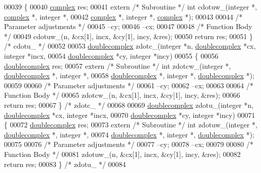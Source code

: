 \begin{DoxyCode}
00039 \{
00040     \hyperlink{structcomplex}{complex} res;
00041     \textcolor{keyword}{extern} \textcolor{comment}{/* Subroutine */} \textcolor{keywordtype}{int} cdotuw\_(integer *, \hyperlink{structcomplex}{complex} *, integer *, 
00042         \hyperlink{structcomplex}{complex} *, integer *, \hyperlink{structcomplex}{complex} *);
00043 
00044     \textcolor{comment}{/* Parameter adjustments */}
00045     --cy;
00046     --cx;
00047 
00048     \textcolor{comment}{/* Function Body */}
00049     cdotuw\_(n, &cx[1], incx, &cy[1], incy, &res);
00050     \textcolor{keywordflow}{return} res;
00051 \} \textcolor{comment}{/* cdotu\_ */}
00052 
00053 \hyperlink{structdoublecomplex}{doublecomplex} zdotc\_(integer *n, \hyperlink{structdoublecomplex}{doublecomplex} *cx, integer *incx, 
00054                      \hyperlink{structdoublecomplex}{doublecomplex} *cy, integer *incy)
00055 \{
00056     \hyperlink{structdoublecomplex}{doublecomplex} res;
00057     \textcolor{keyword}{extern} \textcolor{comment}{/* Subroutine */} \textcolor{keywordtype}{int} zdotcw\_(integer *, \hyperlink{structdoublecomplex}{doublecomplex} *, integer *,
00058          \hyperlink{structdoublecomplex}{doublecomplex} *, integer *, \hyperlink{structdoublecomplex}{doublecomplex} *);
00059 
00060     \textcolor{comment}{/* Parameter adjustments */}
00061     --cy;
00062     --cx;
00063 
00064     \textcolor{comment}{/* Function Body */}
00065     zdotcw\_(n, &cx[1], incx, &cy[1], incy, &res);
00066     \textcolor{keywordflow}{return} res;
00067 \} \textcolor{comment}{/* zdotc\_ */}
00068 
00069 \hyperlink{structdoublecomplex}{doublecomplex} zdotu\_(integer *n, \hyperlink{structdoublecomplex}{doublecomplex} *cx, integer *incx, 
00070                      \hyperlink{structdoublecomplex}{doublecomplex} *cy, integer *incy)
00071 \{
00072     \hyperlink{structdoublecomplex}{doublecomplex} res;
00073     \textcolor{keyword}{extern} \textcolor{comment}{/* Subroutine */} \textcolor{keywordtype}{int} zdotuw\_(integer *, \hyperlink{structdoublecomplex}{doublecomplex} *, integer *,
00074          \hyperlink{structdoublecomplex}{doublecomplex} *, integer *, \hyperlink{structdoublecomplex}{doublecomplex} *);
00075 
00076     \textcolor{comment}{/* Parameter adjustments */}
00077     --cy;
00078     --cx;
00079 
00080     \textcolor{comment}{/* Function Body */}
00081     zdotuw\_(n, &cx[1], incx, &cy[1], incy, &res);
00082     \textcolor{keywordflow}{return} res;
00083 \} \textcolor{comment}{/* zdotu\_ */}
00084 
\end{DoxyCode}
